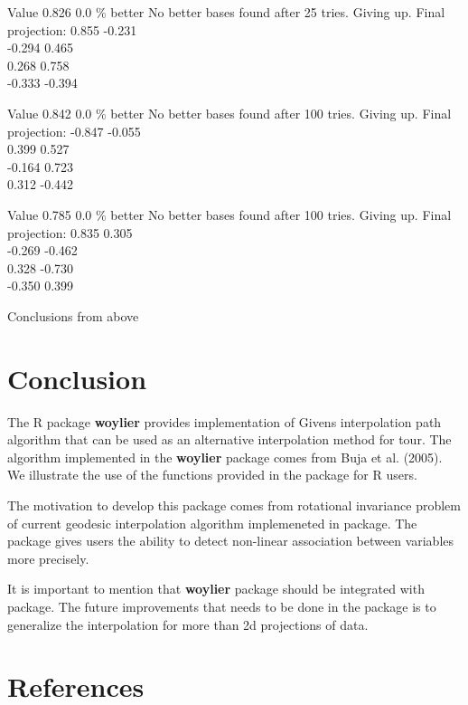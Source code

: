 Value 0.826 0.0 \% better
No better bases found after 25 tries. Giving up.
Final projection:
0.855 -0.231\\
-0.294 0.465\\
0.268 0.758\\
-0.333 -0.394

Value 0.842 0.0 \% better
No better bases found after 100 tries. Giving up.
Final projection:
-0.847 -0.055\\
0.399 0.527\\
-0.164 0.723\\
0.312 -0.442

Value 0.785 0.0 \% better
No better bases found after 100 tries. Giving up.
Final projection:
0.835 0.305\\
-0.269 -0.462\\
0.328 -0.730\\
-0.350 0.399

Conclusions from above

\hypertarget{conclusion}{%
\section{Conclusion}\label{conclusion}}

The R package \textbf{woylier} provides implementation of Givens interpolation path algorithm that can be used as an alternative interpolation method for tour. The algorithm implemented in the \textbf{woylier} package comes from Buja et al. (2005). We illustrate the use of the functions provided in the package for R users.

The motivation to develop this package comes from rotational invariance problem of current geodesic interpolation algorithm implemeneted in  package. The package gives users the ability to detect non-linear association between variables more precisely.

It is important to mention that \textbf{woylier} package should be integrated with  package. The future improvements that needs to be done in the package is to generalize the interpolation for more than 2d projections of data.

\hypertarget{references}{%
\section*{References}\label{references}}

